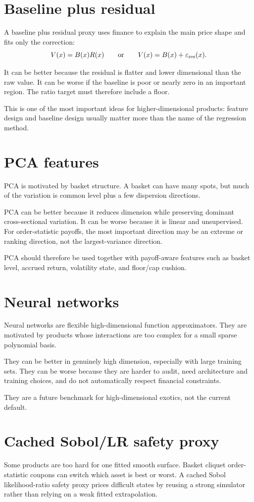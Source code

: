 \documentclass[11pt,oneside]{book}
\theoremstyle{definition}
\begin{document}
\section{Baseline plus residual}
A baseline plus residual proxy uses finance to explain the main price shape and
fits only the correction:
\[
  V(x)=B(x)R(x)
  \qquad\text{or}\qquad
  V(x)=B(x)+\varepsilon_{\rm res}(x).
\]

It can be better because the residual is flatter and lower dimensional than
the raw value. It can be worse if the baseline is poor or nearly zero in an
important region. The ratio target must therefore include a floor.

This is one of the most important ideas for higher-dimensional products:
feature design and baseline design usually matter more than the name of the
regression method.

\section{PCA features}
PCA is motivated by basket structure. A basket can have many spots, but much
of the variation is common level plus a few dispersion directions.

PCA can be better because it reduces dimension while preserving dominant
cross-sectional variation. It can be worse because it is linear and
unsupervised. For order-statistic payoffs, the most important direction may be
an extreme or ranking direction, not the largest-variance direction.

PCA should therefore be used together with payoff-aware features such as basket
level, accrued return, volatility state, and floor/cap cushion.

\section{Neural networks}
Neural networks are flexible high-dimensional function approximators. They are
motivated by products whose interactions are too complex for a small sparse
polynomial basis.

They can be better in genuinely high dimension, especially with large training
sets. They can be worse because they are harder to audit, need architecture and
training choices, and do not automatically respect financial constraints.

They are a future benchmark for high-dimensional exotics, not the current
default.

\section{Cached Sobol/LR safety proxy}
Some products are too hard for one fitted smooth surface. Basket cliquet
order-statistic coupons can switch which asset is best or worst. A cached
Sobol likelihood-ratio safety proxy prices difficult states by reusing a strong
simulator rather than relying on a weak fitted extrapolation.
\end{document}
